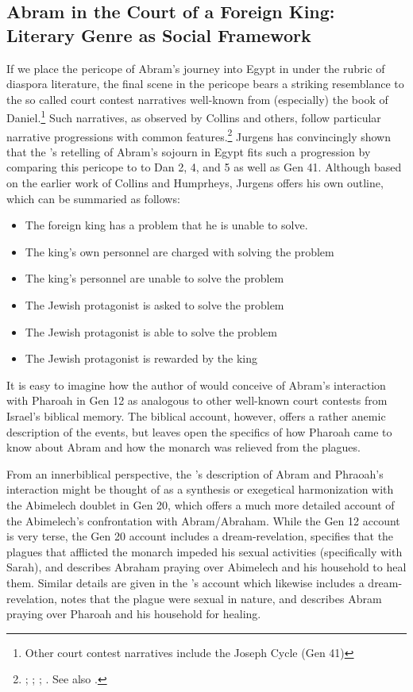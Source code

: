 \subsection{Abram in the Court of a Foreign King: Literary Genre as Social Framework}

If we place the pericope of Abram's journey into Egypt in \ga under the rubric of diaspora literature, the final scene in the pericope bears a striking resemblance to the so called court contest narratives well-known from (especially) the book of Daniel.\footnote{Other court contest narratives include the Joseph Cycle (Gen 41)} Such narratives, as observed by Collins and others, follow particular narrative progressions with common features.\footnote{\cite[TODO: pages]{collins1993}; \cite{humphreys_jbl1973}; \cite{collins_jbl1975}; \cite{wills1990}. See also \cite{niditch-doran_jbl1977}.} Jurgens has convincingly shown that the \ga's retelling of Abram's sojourn in Egypt fits such a progression by comparing this pericope to to Dan 2, 4, and 5 as well as Gen 41. Although based on the earlier work of Collins and Humprheys, Jurgens offers his own outline, which can be summaried as follows\autocite[21]{jurgens_jsj2018}:

\begin{SingleSpace}
\begin{itemize}
    \item The foreign king has a problem that he is unable to solve.
    \item The king's own personnel are charged with solving the problem
    \item The king's personnel are unable to solve the problem
    \item The Jewish protagonist is asked to solve the problem
    \item The Jewish protagonist is able to solve the problem
    \item The Jewish protagonist is rewarded by the king
\end{itemize}
\end{SingleSpace}

It is easy to imagine how the author of \ga would conceive of Abram's interaction with Pharoah in Gen 12 as analogous to other well-known court contests from Israel's biblical memory. The biblical account, however, offers a rather anemic description of the events, but leaves open the specifics of how Pharoah came to know about Abram and how the monarch was relieved from the plagues. 

From an innerbiblical perspective, the \ga's description of Abram and Phraoah's interaction might be thought of as a synthesis or exegetical harmonization with the Abimelech doublet in Gen 20, which offers a much more detailed account of the Abimelech's confrontation with Abram/Abraham. While the Gen 12 account is very terse, the Gen 20 account includes a dream-revelation, specifies that the plagues that afflicted the monarch impeded his sexual activities (specifically with Sarah), and describes Abraham praying over Abimelech and his household to heal them. Similar details are given in the \ga's account which likewise includes a dream-revelation, notes that the plague were sexual in nature, and describes Abram praying over Pharoah and his household for healing. 


